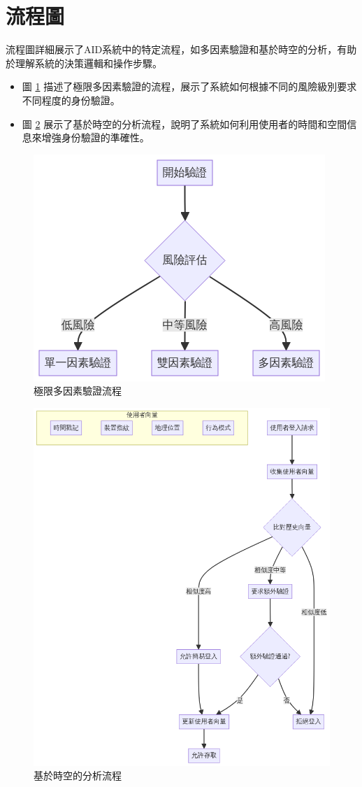 \section{流程圖}
流程圖詳細展示了AID系統中的特定流程，如多因素驗證和基於時空的分析，有助於理解系統的決策邏輯和操作步驟。
\begin{itemize}
  \item 圖 \ref{fig:appendix-emfa} 描述了極限多因素驗證的流程，展示了系統如何根據不同的風險級別要求不同程度的身份驗證。
  \item 圖 \ref{fig:appendix-time-space-analysis} 展示了基於時空的分析流程，說明了系統如何利用使用者的時間和空間信息來增強身份驗證的準確性。
\end{itemize}
\begin{figure}[p]
  \centering
  \includegraphics[width=0.6\linewidth]{figures/EMFA.png}
  \caption{極限多因素驗證流程}
  \label{fig:appendix-emfa}
\end{figure}
\clearpage
\begin{figure}[p]
  \centering
  \includegraphics[width=\linewidth]{figures/time-space-analysis-uml.png}
  \caption{基於時空的分析流程}
  \label{fig:appendix-time-space-analysis}
\end{figure}